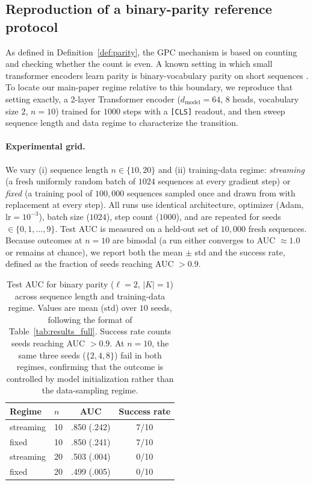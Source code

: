 \documentclass{article}
\theoremstyle{plain}
\theoremstyle{definition}
\theoremstyle{remark}
\begin{document}
\subsection{Reproduction of a binary-parity reference protocol}
\label{appendix:parity_reference}
As defined in Definition~\ref{def:parity}, the GPC mechanism is based on counting and checking whether the count is even. A known setting in which small transformer encoders learn parity is binary-vocabulary parity on short sequences \citep{hahn-2020-theoretical}. To locate our main-paper regime relative to this boundary, we reproduce that setting exactly, a 2-layer Transformer encoder ($d_{\text{model}}=64$, 8 heads, vocabulary size $2$, $n=10$) trained for $1000$ steps with a \texttt{[CLS]} readout, and then sweep sequence length and data regime to characterize the transition.

\paragraph{Experimental grid.}
We vary (i) sequence length $n \in \{10, 20\}$ and (ii) training-data regime: \emph{streaming} (a fresh uniformly random batch of $1024$ sequences at every gradient step) or \emph{fixed} (a training pool of $100{,}000$ sequences sampled once and drawn from with replacement at every step). All runs use identical architecture, optimizer (Adam, $\mathrm{lr}=10^{-3}$), batch size ($1024$), step count ($1000$), and are repeated for seeds $\in \{0,1,\ldots,9\}$. Test AUC is measured on a held-out set of $10{,}000$ fresh sequences. Because outcomes at $n=10$ are bimodal (a run either converges to AUC $\approx 1.0$ or remains at chance), we report both the mean $\pm$ std and the success rate, defined as the fraction of seeds reaching AUC $> 0.9$.

\begin{table}[h]
\centering
\caption{Test AUC for binary parity ($\ell=2$, $|K|=1$) across sequence length and training-data regime. Values are mean (std) over $10$ seeds, following the format of Table~\ref{tab:results_full}. Success rate counts seeds reaching AUC $>0.9$. At $n=10$, the same three seeds ($\{2,4,8\}$) fail in both regimes, confirming that the outcome is controlled by model initialization rather than the data-sampling regime.}
\label{tab:parity_reference}
\small
\begin{tabular}{@{}llcc@{}}
\toprule
Regime & $n$ & AUC & Success rate \\
\midrule
streaming & 10 & .850 (.242) & 7/10 \\
fixed     & 10 & .850 (.241) & 7/10 \\
streaming & 20 & .503 (.004) & 0/10 \\
fixed     & 20 & .499 (.005) & 0/10 \\
\bottomrule
\end{tabular}
\end{table}
\end{document}
